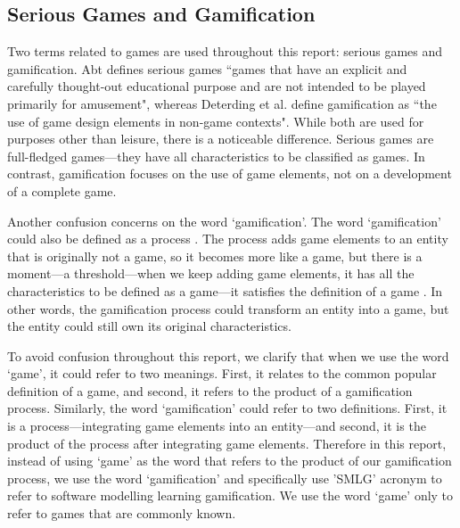 \documentclass[12pt, a4paper]{report}
\begin{document}
\subsection{Serious Games and Gamification}
Two terms related to games are used throughout this report: serious games and gamification. Abt \cite{abt1987serious} defines serious games ``games that have an explicit and carefully thought-out educational purpose and are not intended to be played primarily for amusement", whereas Deterding et al. \cite{deterding2011game} define gamification as ``the use of game design elements in non-game contexts". While both are used for purposes other than leisure, there is a noticeable difference. Serious games are full-fledged games---they have all characteristics to be classified as games. In contrast, gamification focuses on the use of game elements, not on a development of a complete game. 

Another confusion concerns on the word `gamification'. The word `gamification' could also be defined as a process \cite{werbach2014re}. The process adds game elements to an entity that is originally not a game, so it becomes more like a game, but there is a moment---a threshold---when we keep adding game elements, it has all the characteristics to be defined as a game---it satisfies the definition of a game \cite{yohannis2014defining}. In other words, the gamification process could transform an entity into a game, but the entity could still own its original characteristics. 

To avoid confusion throughout this report, we clarify that when we use the word `game', it could refer to two meanings. First, it relates to the common popular definition of a game, and second, it refers to the product of a gamification process. Similarly, the word `gamification' could refer to two definitions. First, it is a process---integrating game elements into an entity---and second, it is the product of the process after integrating game elements. Therefore in this report, instead of using `game' as the word that refers to the product of our gamification process, we use the word `gamification' and specifically use 'SMLG' acronym to refer to software modelling learning gamification. We use the word `game' only to refer to games that are commonly known.        
\end{document}

